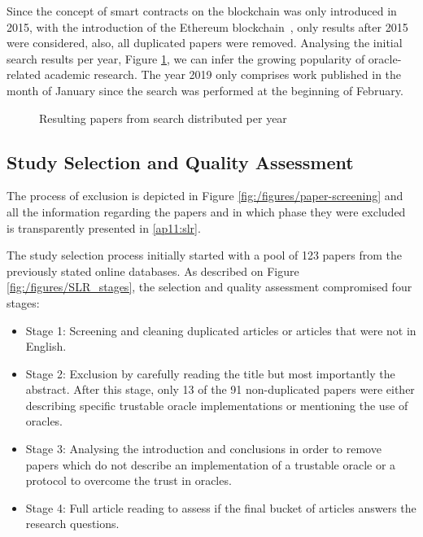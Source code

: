 \documentclass[final,3p,12pt,twocolumn]{elsarticle}
\begin{document}
Since the concept of smart contracts on the blockchain was only introduced in 2015, with the introduction of the Ethereum blockchain~\cite{GavinWood2014}, only results after 2015 were considered, also, all duplicated papers were removed. Analysing the initial search results per year, Figure \ref{search-results-per-year}, we can infer the growing popularity of oracle-related academic research. The year 2019 only comprises work published in the month of January since the search was performed at the beginning of February.

\begin{figure}[H]
  \centering
  \caption{Resulting papers from search distributed per year}
  \label{search-results-per-year}
\end{figure}

\subsection{Study Selection and Quality Assessment}
The process of exclusion is depicted in Figure \ref{fig:/figures/paper-screening} and all the information regarding the papers and in which phase they were excluded is transparently presented in \ref{ap11:slr}.

The study selection process initially started with a pool of 123 papers from the previously stated online databases. As described on Figure \ref{fig:/figures/SLR_stages}, the selection and quality assessment compromised four stages:
\begin{itemize}
  \item Stage 1: Screening and cleaning duplicated articles or articles that were not in English.
  \item Stage 2: Exclusion by carefully reading the title but most importantly the abstract. After this stage, only 13 of the 91 non-duplicated papers were either describing specific trustable oracle implementations or mentioning the use of oracles.
  \item Stage 3: Analysing the introduction and conclusions in order to remove papers which do not describe an implementation of a trustable oracle or a protocol to overcome the trust in oracles.
  \item Stage 4: Full article reading to assess if the final bucket of articles answers the research questions.
\end{itemize}
\end{document}
